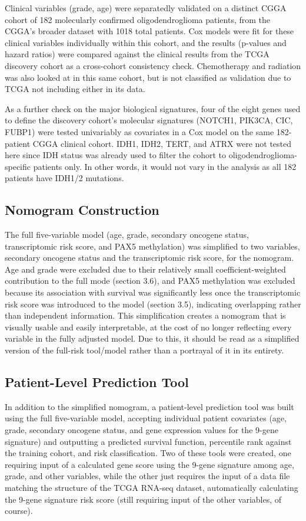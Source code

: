 \documentclass[11pt, letterpaper]{article}
\begin{document}
Clinical variables (grade, age) were separatedly validated on a distinct CGGA cohort of 182 molecularly confirmed oligodendroglioma patients, from the CGGA's broader dataset with 1018 total patients. Cox models were fit for these clinical variables individually within this cohort, and the results (p-values and hazard ratios) were compared against the clinical results from the TCGA discovery cohort as a cross-cohort consistency check. Chemotherapy and radiation was also looked at in this same cohort, but is not classified as validation due to TCGA not including either in its data.

As a further check on the major biological signatures, four of the eight genes used to define the discovery cohort's molecular signatures (NOTCH1, PIK3CA, CIC, FUBP1) were tested univariably as covariates in a Cox model on the same 182-patient CGGA clinical cohort. IDH1, IDH2, TERT, and ATRX were not tested here since IDH status was already used to filter the cohort to oligodendroglioma-specific patients only. In other words, it would not vary in the analysis as all 182 patients have IDH1/2 mutations.

\subsection{Nomogram Construction}

The full five-variable model (age, grade, secondary oncogene status, transcriptomic risk score, and PAX5 methylation) was simplified to two variables, secondary oncogene status and the transcriptomic risk score, for the nomogram. Age and grade were excluded due to their relatively small coefficient-weighted contribution to the full mode (section 3.6), and PAX5 methylation was excluded because its association with survival was significantly less once the transcriptomic risk score was introduced to the model (section 3.5), indicating overlapping rather than independent information. This simplification creates a nomogram that is visually usable and easily interpretable, at the cost of no longer reflecting every variable in the fully adjusted model. Due to this, it should be read as a simplified version of the full-risk tool/model rather than a portrayal of it in its entirety. 

\subsection{Patient-Level Prediction Tool}

In addition to the simplified nomogram, a patient-level prediction tool was built using the full five-variable model, accepting individual patient covariates (age, grade, secondary oncogene status, and gene expression values for the 9-gene signature) and outputting a predicted survival function, percentile rank against the training cohort, and risk classification. Two of these tools were created, one requiring input of a calculated gene score using the 9-gene signature among age, grade, and other variables, while the other just requires the input of a data file matching the structure of the TCGA RNA-seq dataset, automatically calculating the 9-gene signature risk score (still requiring input of the other variables, of course).
\end{document}
